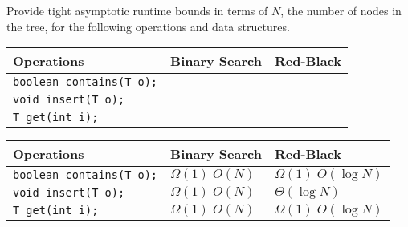 \begin{blocksection}
\question Provide tight asymptotic runtime bounds in terms of $N$, the number
of nodes in the tree, for the following operations and data structures.

\ifprintanswers\else
{
\renewcommand{\arraystretch}{2}
\setlength{\tabcolsep}{16pt}
\begin{tabularx}{\textwidth}{Xp{1in}p{1in}}
Operations                         & Binary Search      & Red-Black      \\\hline
\lstinline$boolean contains(T o);$ &                    &                \\
\lstinline$void insert(T o);$      &                    &                \\
\lstinline$T get(int i);$          &                    &
\end{tabularx}
}
\fi

\begin{solution}
{
\renewcommand{\arraystretch}{2}
\setlength{\tabcolsep}{16pt}
\begin{tabularx}{\textwidth}{Xll}
Operations                         & Binary Search      & Red-Black               \\\hline
\lstinline$boolean contains(T o);$ & $\Omega(1)\; O(N)$ & $\Omega(1)\; O(\log N)$ \\
\lstinline$void insert(T o);$      & $\Omega(1)\; O(N)$ & $\Theta(\log N)$        \\
\lstinline$T get(int i);$          & $\Omega(1)\; O(N)$ & $\Omega(1)\; O(\log N)$
\end{tabularx}
}
\end{solution}
\end{blocksection}
